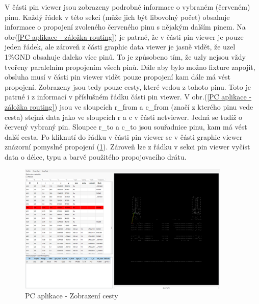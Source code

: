 V části pin viewer jsou zobrazeny podrobné informace o vybraném (červeném) pinu.
Každý řádek v této sekci (může jich být libovolný počet) obsahuje informace o propojení zvoleného červeného pinu s nějakým
dalším pinem. Na obr(\ref{PC aplikace - záložka routing}) je patrné, že v části pin viewer je pouze jeden řádek, ale zároveň
z části graphic data viewer je jasně vidět, že uzel 1\%GND obsahuje daleko více pinů. To je způsobeno tím,
že uzly nejsou vždy tvořeny paralelním propojením všech pinů. Dále aby bylo možno fixture zapojit, obsluha musí v části
pin viewer vidět pouze propojení kam dále má vést propojení. Zobrazeny jsou tedy pouze cesty, které vedou z tohoto pinu.
Toto je patrné i z informací v příslušném řádku části pin viewer. V obr.(\ref{PC aplikace - záložka routing}) jsou ve sloupcích
r\_from a c\_from (značí z kterého pinu vede cesta) stejná data jako ve sloupcích r a c v části netviewer. Jedná se tudíž
o červený vybraný pin. Sloupce r\_to a c\_to jsou souřadnice pinu, kam má vést další cesta. Po kliknutí do řádku
v části pin viewer se v části graphic viewer znázorní pomyslné propojení (\ref{PC aplikace - Zobrazení cesty}).
Zároveň lze z řádku v sekci pin viewer vyčíst data o délce, typu a barvě použitého propojovacího drátu.
\begin{figure}[ht!]
    \centering
    \includegraphics[width = 0.9\textwidth]{obrazky/PC_AP_top_only1.png}
    \caption{PC aplikace - Zobrazení cesty}
    \label{PC aplikace - Zobrazení cesty}
\end{figure}
